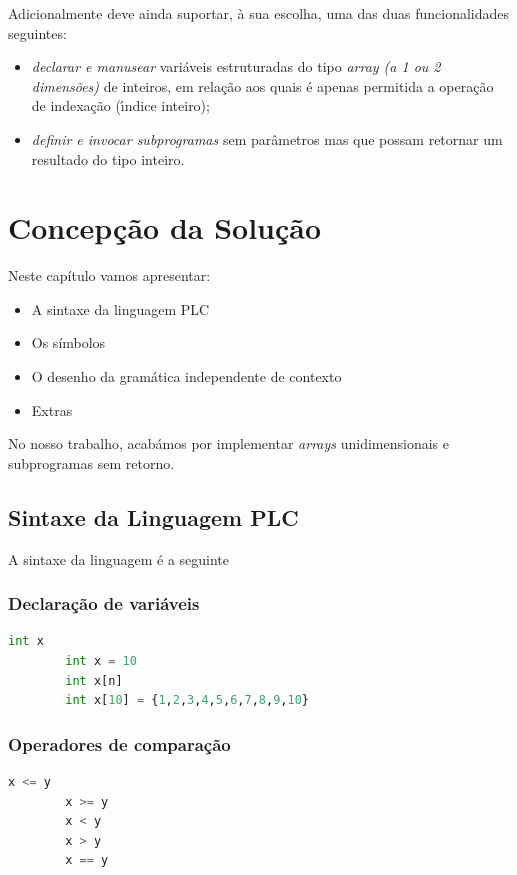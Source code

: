 \documentclass[11pt,a4paper]{report}
\begin{document}
    Adicionalmente deve ainda suportar, à sua escolha, uma das duas funcionalidades seguintes:
    \begin{itemize}
        \item \textit{declarar e manusear} variáveis estruturadas do tipo \textit{array (a 1 ou 2 dimensões)} de inteiros, em relação aos quais é apenas permitida a operação de indexação (ı́ndice inteiro);
        \item \textit{definir e invocar subprogramas} sem parâmetros mas que possam retornar um resultado do tipo inteiro.
    \end{itemize}


    \chapter{Concepção da Solução}
    Neste capítulo vamos apresentar:
    \begin{itemize}
        \item A sintaxe da linguagem PLC
        \item Os símbolos
        \item O desenho da gramática independente de contexto
        \item Extras
    \end{itemize}
    No nosso trabalho, acabámos por implementar \textit{arrays} unidimensionais e subprogramas sem retorno.


    \section{Sintaxe da Linguagem PLC}
    A sintaxe da linguagem é a seguinte

    \subsection{Declaração de variáveis}
    \begin{lstlisting}[language=Python]
        int x
        int x = 10
        int x[n]
        int x[10] = {1,2,3,4,5,6,7,8,9,10}
    \end{lstlisting}

    \subsection{Operadores de comparação}
    \begin{lstlisting}[language=Python]
        x <= y
        x >= y
        x < y
        x > y
        x == y
    \end{lstlisting}
\end{document}
